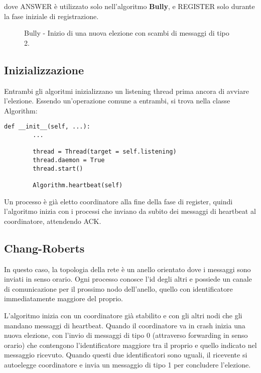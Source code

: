 \documentclass[conference]{IEEEtran}
\begin{document}
dove ANSWER è utilizzato solo nell'algoritmo \textbf{Bully}, e REGISTER solo durante la fase iniziale di registrazione.

\begin{figure}[htbp]
  \centering
  
  \caption{Bully - Inizio di una nuova elezione con scambi di messaggi di tipo 2.}
\end{figure}


\subsection{Inizializzazione}\label{init}

Entrambi gli algoritmi inizializzano un listening thread prima ancora di avviare l'elezione. Essendo un'operazione comune a entrambi, si trova nella classe Algorithm:

\begin{lstlisting}
def __init__(self, ...):
        ...
        
        thread = Thread(target = self.listening)
        thread.daemon = True
        thread.start()

        Algorithm.heartbeat(self)
\end{lstlisting}

Un processo è già eletto coordinatore alla fine della fase di register, quindi l'algoritmo inizia con i processi che inviano da subito dei messaggi di heartbeat al coordinatore, attendendo ACK.


\subsection{Chang-Roberts}\label{ring}

In questo caso, la topologia della rete è un anello orientato dove i messaggi sono inviati in senso orario.
Ogni processo conosce l'id degli altri e possiede un canale di comunicazione per il prossimo nodo dell'anello, quello con identificatore immediatamente maggiore del proprio.

L'algoritmo inizia con un coordinatore già stabilito e con gli altri nodi che gli mandano messaggi di heartbeat.
Quando il coordinatore va in crash inizia una nuova elezione, con l'invio di messaggi di tipo 0 (attraverso forwarding in senso orario) che contengono l'identificatore maggiore tra il proprio e quello indicato nel messaggio ricevuto. Quando questi due identificatori sono uguali, il ricevente si autoelegge coordinatore e invia un messaggio di tipo 1 per concludere l'elezione.
\end{document}
